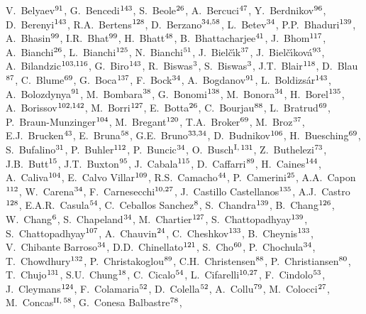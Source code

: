 \begin{flushleft}
V.~Belyaev$^{\rm 91}$, 
G.~Bencedi$^{\rm 143}$, 
S.~Beole$^{\rm 26}$, 
A.~Bercuci$^{\rm 47}$, 
Y.~Berdnikov$^{\rm 96}$, 
D.~Berenyi$^{\rm 143}$, 
R.A.~Bertens$^{\rm 128}$, 
D.~Berzano$^{\rm 34,58}$, 
L.~Betev$^{\rm 34}$, 
P.P.~Bhaduri$^{\rm 139}$, 
A.~Bhasin$^{\rm 99}$, 
I.R.~Bhat$^{\rm 99}$, 
H.~Bhatt$^{\rm 48}$, 
B.~Bhattacharjee$^{\rm 41}$, 
J.~Bhom$^{\rm 117}$, 
A.~Bianchi$^{\rm 26}$, 
L.~Bianchi$^{\rm 125}$, 
N.~Bianchi$^{\rm 51}$, 
J.~Biel\v{c}\'{\i}k$^{\rm 37}$, 
J.~Biel\v{c}\'{\i}kov\'{a}$^{\rm 93}$, 
A.~Bilandzic$^{\rm 103,116}$, 
G.~Biro$^{\rm 143}$, 
R.~Biswas$^{\rm 3}$, 
S.~Biswas$^{\rm 3}$, 
J.T.~Blair$^{\rm 118}$, 
D.~Blau$^{\rm 87}$, 
C.~Blume$^{\rm 69}$, 
G.~Boca$^{\rm 137}$, 
F.~Bock$^{\rm 34}$, 
A.~Bogdanov$^{\rm 91}$, 
L.~Boldizs\'{a}r$^{\rm 143}$, 
A.~Bolozdynya$^{\rm 91}$, 
M.~Bombara$^{\rm 38}$, 
G.~Bonomi$^{\rm 138}$, 
M.~Bonora$^{\rm 34}$, 
H.~Borel$^{\rm 135}$, 
A.~Borissov$^{\rm 102,142}$, 
M.~Borri$^{\rm 127}$, 
E.~Botta$^{\rm 26}$, 
C.~Bourjau$^{\rm 88}$, 
L.~Bratrud$^{\rm 69}$, 
P.~Braun-Munzinger$^{\rm 104}$, 
M.~Bregant$^{\rm 120}$, 
T.A.~Broker$^{\rm 69}$, 
M.~Broz$^{\rm 37}$, 
E.J.~Brucken$^{\rm 43}$, 
E.~Bruna$^{\rm 58}$, 
G.E.~Bruno$^{\rm 33,34}$, 
D.~Budnikov$^{\rm 106}$, 
H.~Buesching$^{\rm 69}$, 
S.~Bufalino$^{\rm 31}$, 
P.~Buhler$^{\rm 112}$, 
P.~Buncic$^{\rm 34}$, 
O.~Busch$^{\rm I,}$$^{\rm 131}$, 
Z.~Buthelezi$^{\rm 73}$, 
J.B.~Butt$^{\rm 15}$, 
J.T.~Buxton$^{\rm 95}$, 
J.~Cabala$^{\rm 115}$, 
D.~Caffarri$^{\rm 89}$, 
H.~Caines$^{\rm 144}$, 
A.~Caliva$^{\rm 104}$, 
E.~Calvo Villar$^{\rm 109}$, 
R.S.~Camacho$^{\rm 44}$, 
P.~Camerini$^{\rm 25}$, 
A.A.~Capon$^{\rm 112}$, 
W.~Carena$^{\rm 34}$, 
F.~Carnesecchi$^{\rm 10,27}$, 
J.~Castillo Castellanos$^{\rm 135}$, 
A.J.~Castro$^{\rm 128}$, 
E.A.R.~Casula$^{\rm 54}$, 
C.~Ceballos Sanchez$^{\rm 8}$, 
S.~Chandra$^{\rm 139}$, 
B.~Chang$^{\rm 126}$, 
W.~Chang$^{\rm 6}$, 
S.~Chapeland$^{\rm 34}$, 
M.~Chartier$^{\rm 127}$, 
S.~Chattopadhyay$^{\rm 139}$, 
S.~Chattopadhyay$^{\rm 107}$, 
A.~Chauvin$^{\rm 24}$, 
C.~Cheshkov$^{\rm 133}$, 
B.~Cheynis$^{\rm 133}$, 
V.~Chibante Barroso$^{\rm 34}$, 
D.D.~Chinellato$^{\rm 121}$, 
S.~Cho$^{\rm 60}$, 
P.~Chochula$^{\rm 34}$, 
T.~Chowdhury$^{\rm 132}$, 
P.~Christakoglou$^{\rm 89}$, 
C.H.~Christensen$^{\rm 88}$, 
P.~Christiansen$^{\rm 80}$, 
T.~Chujo$^{\rm 131}$, 
S.U.~Chung$^{\rm 18}$, 
C.~Cicalo$^{\rm 54}$, 
L.~Cifarelli$^{\rm 10,27}$, 
F.~Cindolo$^{\rm 53}$, 
J.~Cleymans$^{\rm 124}$, 
F.~Colamaria$^{\rm 52}$, 
D.~Colella$^{\rm 52}$, 
A.~Collu$^{\rm 79}$, 
M.~Colocci$^{\rm 27}$, 
M.~Concas$^{\rm II,}$$^{\rm 58}$, 
G.~Conesa Balbastre$^{\rm 78}$, 

\end{flushleft}
